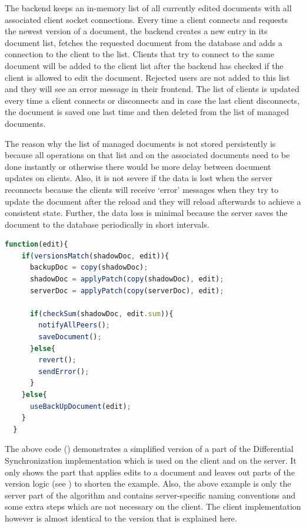 The backend keeps an in-memory list of all currently edited documents with all associated client socket connections. Every time a client connects and requests the newest version of a document, the backend creates a new entry in its document list, fetches the requested document from the database and adds a connection to the client to the list. Clients that try to connect to the same document will be added to the client list after the backend has checked if the client is allowed to edit the document. Rejected users are not added to this list and they will see an error message in their frontend. The list of clients is updated every time a client connects or disconnects and in case the last client disconnects, the document is saved one last time and then deleted from the list of managed documents.

The reason why the list of managed documents is not stored persistently is because all operations on that list and on the associated documents need to be done instantly or otherwise there would be more delay between document updates on clients. Also, it is not severe if the data is lost when the server reconnects because the clients will receive `error' messages when they try to update the document after the reload and they will reload afterwards to achieve a consistent state. Further, the data loss is minimal because the server saves the document to the database periodically in short intervals.

\begin{lstlisting}[language=JavaScript, caption=DS implementation (Backend), label=lst:ds-backend]
  function(edit){
    if(versionsMatch(shadowDoc, edit)){
      backupDoc = copy(shadowDoc);
      shadowDoc = applyPatch(copy(shadowDoc), edit);
      serverDoc = applyPatch(copy(serverDoc), edit);

      if(checkSum(shadowDoc, edit.sum)){
        notifyAllPeers();
        saveDocument();
      }else{
        revert();
        sendError();
      }
    }else{
      useBackUpDocument(edit);
    }
  }
\end{lstlisting}

The above code () demonstrates a simplified version of a part of the Differential Synchronization implementation which is used on the client and on the server. It only shows the part that applies edits to a document and leaves out parts of the version logic (see ) to shorten the example. Also, the above example is only the server part of the algorithm and contains server-specific naming conventions and some extra steps which are not necessary on the client. The client implementation however is almost identical to the version that is explained here.

